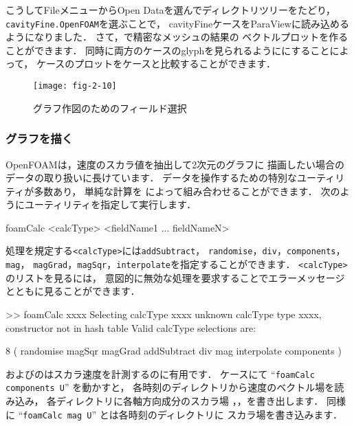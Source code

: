 こうしてFileメニューからOpen Dataを選んでディレクトリツリーをたどり，
\texttt{cavityFine.OpenFOAM}を選ぶことで，
cavityFineケースをParaViewに読み込めるようになりました．
さて，で精密なメッシュの結果の
ベクトルプロットを作ることができます．
同時に両方のケースのglyphを見られるようににすることによって，
ケースのプロットをケースと比較することができます．


\begin{figure}[ht]
 \texttt{[image: fig-2-10]}
 \caption{グラフ作図のためのフィールド選択}
 \label{fig:2.10}
\end{figure}


\subsubsection{グラフを描く}
\label{sssec:2.1.5.7}
OpenFOAMは，速度のスカラ値を抽出して2次元のグラフに
描画したい場合のデータの取り扱いに長けています．
データを操作するための特別なユーティリティが多数あり，
単純な計算を
%
%
によって組み合わせることができます．
次のようにユーティリティを指定して実行します．
\begin{OFverbatim}[terminal]
foamCalc <calcType> <fieldName1 ... fieldNameN>
\end{OFverbatim}
処理を規定する\texttt{<calcType>}には\texttt{addSubtract}，
\texttt{randomise}，\texttt{div}，\texttt{components}，\texttt{mag}，
\texttt{magGrad}，\texttt{magSqr}，\texttt{interpolate}を指定することができます．
\texttt{<calcType>}のリストを見るには，
意図的に無効な処理を要求することでエラーメッセージとともに見ることができます．
\begin{OFverbatim}[baselinestretch=0.8, weight=\small]
>> foamCalc xxxx
Selecting calcType xxxx
unknown calcType type xxxx, constructor not in hash table
Valid calcType selections are:

8
(
randomise
magSqr
magGrad
addSubtract
div
mag
interpolate
components
)
\end{OFverbatim}

およびのはスカラ速度を計測するのに有用です．
ケースにて ``\texttt{foamCalc components U}'' を動かすと，
各時刻のディレクトリから速度のベクトル場を読み込み，
各ディレクトリに各軸方向成分のスカラ場
，，を書き出します．
同様に ``\texttt{foamCalc mag U}'' とは各時刻のディレクトリに
スカラ場を書き込みます．

